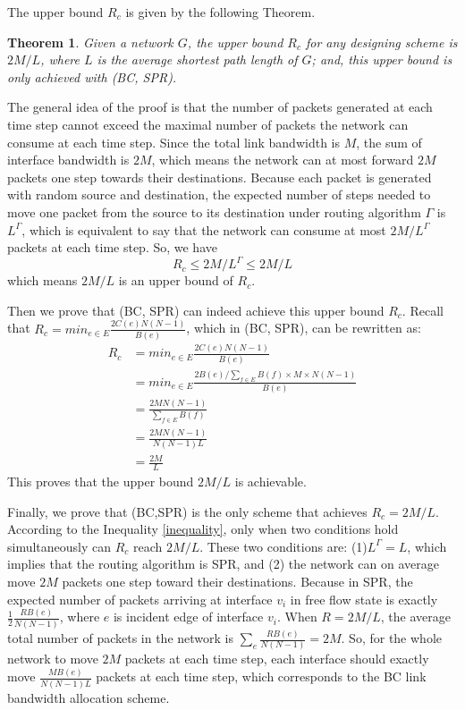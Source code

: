\documentclass[journal]{IEEEtran}
\begin{document}
{The upper bound $R_c$ is given by the following Theorem.
\newtheorem{thm}{Theorem}
\begin{thm}
\label{theorem} Given a network $G$, the upper bound $R_c$ for any
designing scheme is $2M/L$, where $L$ is the average shortest path
length of $G$; and, this upper bound is only achieved with (BC,
SPR).
\end{thm}
\begin{IEEEproof}
The general idea of the proof is that the number of packets
generated at each time step cannot exceed the maximal number of
packets the network can consume at each time step. Since the total
link bandwidth is $M$, the sum of interface bandwidth is $2M$, which
means the network can at most forward $2M$ packets one step towards
their destinations. Because each packet is generated with random
source and destination, the expected number of steps needed to move
one packet from the source to its destination under routing
algorithm $\Gamma$ is $L^{\Gamma}$, which is equivalent to say that
the network can consume at most $2M/L^{\Gamma}$ packets at each time
step. So, we have
\begin{equation}
\label{inequality} R_c\le 2M/L^{\Gamma} \le 2M/L \end{equation}
which means $2M/L$ is an upper bound of $R_c$.

Then we prove that (BC, SPR) can indeed achieve this upper bound
$R_c$. Recall that $R_c=min_{e\in E}\frac{2C(e)N(N-1)}{B(e)}$, which
in (BC, SPR), can be rewritten as:
\begin{equation*}
\begin{split}
R_c& =min_{e\in E} \frac{2C(e)N(N-1)}{B(e)} \\
&= min_{e\in E} \frac{2B(e)/\sum_{f\in E}B(f)\times M\times N(N-1)}{B(e)} \\
&=\frac{2MN(N-1)}{\sum_{f\in E}B(f)}\\
&=\frac{2MN(N-1)}{N(N-1)L}\\
&=\frac{2M}{L}
\end{split}
\end{equation*}
This proves that the upper bound $2M/L$ is achievable.

Finally, we prove that (BC,SPR) is the only scheme that achieves
$R_c=2M/L$. According to the Inequality \ref{inequality}, only when
two conditions hold simultaneously can $R_c$ reach $2M/L$. These two
conditions are: (1)$L^{\Gamma}=L$, which implies that the routing
algorithm is SPR, and (2) the network can on average move $2M$
packets one step toward their destinations.  Because in SPR, the
expected number of packets arriving at interface $v_i$ in free flow
state is exactly $\frac{1}{2}\frac{RB(e)}{N(N-1)}$, where $e$ is
incident edge of interface $v_i$. When $R=2M/L$, the average total
number of packets in the network is $\sum_e\frac{RB(e)}{N(N-1)}=2M$.
So, for the whole network to move $2M$ packets at each time step,
each interface should exactly move $\frac{MB(e)}{N(N-1)L}$ packets
at each time step, which corresponds to the BC link bandwidth
allocation scheme.
\end{IEEEproof}

}
\end{document}
